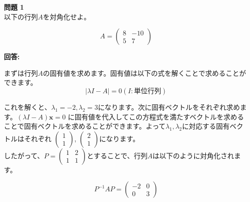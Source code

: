 \documentclass{jlreq}
\begin{document}
\begin{tcolorbox}[enhanced,
  colback=white!85!gray,
  drop fuzzy shadow,
  boxrule=0.3mm,
  arc=0mm,
  left=0pt,
  top=0pt,
  sharp corners,
  width=\textwidth,
  ]
  \textbf{問題 1} \\
  以下の行列$A$を対角化せよ。

  \begin{equation*}
    A = \begin{pmatrix}
      8 & -10 \\
      5 & 7
    \end{pmatrix}
  \end{equation*}
\tcblower

\begin{tcolorbox}[
  coltext=white!10!blue,
  colback=white!90!purple!90!blue,
  drop fuzzy shadow,
  boxrule=0mm,
  arc=0mm,
  width=1.3cm,
  left=0pt,
  right=0pt,
  top=0pt,
  bottom=0pt,
  halign=flush left,
]
\end{tcolorbox}
\tcblower
\textbf{回答:}

まずは行列$A$の固有値を求めます。固有値は以下の式を解くことで求めることができます。
\begin{equation*}
  |\lambda I - A| = 0  (I: 単位行列)
\end{equation*}

これを解くと、$\lambda_1 = -2, \lambda_2 = 3$になります。次に固有ベクトルをそれぞれ求めます。$(\lambda I - A) \boldsymbol{x} = 0$
に固有値を代入してこの方程式を満たすベクトルを求めることで固有ベクトルを求めることができます。よって$\lambda_1, \lambda_2$に対応する固有ベクトルはそれぞれ
$\left ( \begin{matrix} 1 \\ 1 \end{matrix}\right)$, $\left ( \begin{matrix} 2 \\ 1 \end{matrix}\right)$になります。 \\
したがって、$P = \begin{pmatrix} 1 & 2 \\ 1 & 1 \end{pmatrix}$とすることで、行列$A$は以下のように対角化されます。

\begin{equation*}
  P^{-1}AP = \begin{pmatrix}
    -2 & 0 \\
    0 & 3
  \end{pmatrix}
\end{equation*}

\end{tcolorbox}%
\end{document}
